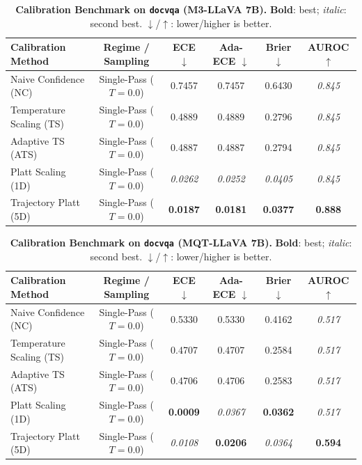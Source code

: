 \begin{table}[t]
\setlength{\tabcolsep}{4pt}
\renewcommand{\arraystretch}{1.05}
\centering
\footnotesize
\begin{tabular}{lccccc}
\toprule
\textbf{Calibration Method} & \textbf{Regime / Sampling} & \textbf{ECE} $\downarrow$ & \textbf{Ada-ECE} $\downarrow$ & \textbf{Brier} $\downarrow$ & \textbf{AUROC} $\uparrow$ \\
\midrule
Naive Confidence (NC) & Single-Pass ($T = 0.0$) & 0.7457 & 0.7457 & 0.6430 & \textit{0.845} \\
Temperature Scaling (TS) & Single-Pass ($T = 0.0$) & 0.4889 & 0.4889 & 0.2796 & \textit{0.845} \\
Adaptive TS (ATS) & Single-Pass ($T = 0.0$) & 0.4887 & 0.4887 & 0.2794 & \textit{0.845} \\
Platt Scaling (1D) & Single-Pass ($T = 0.0$) & \textit{0.0262} & \textit{0.0252} & \textit{0.0405} & \textit{0.845} \\
Trajectory Platt (5D) & Single-Pass ($T = 0.0$) & \textbf{0.0187} & \textbf{0.0181} & \textbf{0.0377} & \textbf{0.888} \\
\bottomrule
\end{tabular}
\caption{\textbf{Calibration Benchmark on \texttt{docvqa} (M3-LLaVA 7B).} \textbf{Bold}: best; \textit{italic}: second best. $\downarrow$/$\uparrow$: lower/higher is better.}
\label{tab:benchmark_m3_docvqa}
\end{table}

\begin{table}[t]
\setlength{\tabcolsep}{4pt}
\renewcommand{\arraystretch}{1.05}
\centering
\footnotesize
\begin{tabular}{lccccc}
\toprule
\textbf{Calibration Method} & \textbf{Regime / Sampling} & \textbf{ECE} $\downarrow$ & \textbf{Ada-ECE} $\downarrow$ & \textbf{Brier} $\downarrow$ & \textbf{AUROC} $\uparrow$ \\
\midrule
Naive Confidence (NC) & Single-Pass ($T = 0.0$) & 0.5330 & 0.5330 & 0.4162 & \textit{0.517} \\
Temperature Scaling (TS) & Single-Pass ($T = 0.0$) & 0.4707 & 0.4707 & 0.2584 & \textit{0.517} \\
Adaptive TS (ATS) & Single-Pass ($T = 0.0$) & 0.4706 & 0.4706 & 0.2583 & \textit{0.517} \\
Platt Scaling (1D) & Single-Pass ($T = 0.0$) & \textbf{0.0009} & \textit{0.0367} & \textbf{0.0362} & \textit{0.517} \\
Trajectory Platt (5D) & Single-Pass ($T = 0.0$) & \textit{0.0108} & \textbf{0.0206} & \textit{0.0364} & \textbf{0.594} \\
\bottomrule
\end{tabular}
\caption{\textbf{Calibration Benchmark on \texttt{docvqa} (MQT-LLaVA 7B).} \textbf{Bold}: best; \textit{italic}: second best. $\downarrow$/$\uparrow$: lower/higher is better.}
\label{tab:benchmark_mqt_docvqa}
\end{table}
